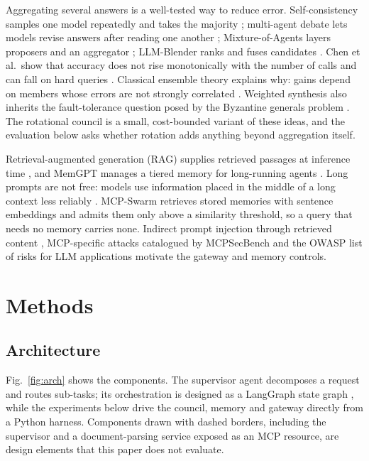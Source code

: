 Aggregating several answers is a well-tested way to reduce error. Self-consistency samples one model repeatedly and takes the majority \cite{wang2023selfconsistency}; multi-agent debate lets models revise answers after reading one another \cite{du2024debate}; Mixture-of-Agents layers proposers and an aggregator \cite{wang2024moa}; LLM-Blender ranks and fuses candidates \cite{jiang2023blender}. Chen et al.\ show that accuracy does not rise monotonically with the number of calls and can fall on hard queries \cite{chen2024calls}. Classical ensemble theory explains why: gains depend on members whose errors are not strongly correlated \cite{dietterich2000ensemble}. Weighted synthesis also inherits the fault-tolerance question posed by the Byzantine generals problem \cite{lamport1982byzantine}. The rotational council is a small, cost-bounded variant of these ideas, and the evaluation below asks whether rotation adds anything beyond aggregation itself.

Retrieval-augmented generation (RAG) supplies retrieved passages at inference time \cite{lewis2020rag}, and MemGPT manages a tiered memory for long-running agents \cite{packer2023memgpt}. Long prompts are not free: models use information placed in the middle of a long context less reliably \cite{liu2024lost}. MCP-Swarm retrieves stored memories with sentence embeddings \cite{reimers2019sbert} and admits them only above a similarity threshold, so a query that needs no memory carries none. Indirect prompt injection through retrieved content \cite{greshake2023injection}, MCP-specific attacks catalogued by MCPSecBench \cite{yang2025mcpsecbench} and the OWASP list of risks for LLM applications \cite{owasp2025} motivate the gateway and memory controls.

\section{Methods}
\subsection{Architecture}
Fig.~\ref{fig:arch} shows the components. The supervisor agent decomposes a request and routes sub-tasks; its orchestration is designed as a LangGraph state graph \cite{langgraph}, while the experiments below drive the council, memory and gateway directly from a Python harness. Components drawn with dashed borders, including the supervisor and a document-parsing service exposed as an MCP resource, are design elements that this paper does not evaluate.

